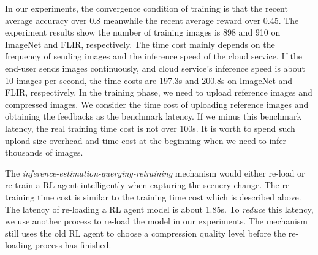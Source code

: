 \textcolor{revise}{In our experiments, the convergence condition of training is that the recent average accuracy over 0.8 meanwhile the recent average reward over 0.45. The experiment results show the number of training images is 898 and 910 on ImageNet and FLIR, respectively. The time cost mainly depends on the frequency of sending images and the inference speed of the cloud service. If the end-user sends images continuously, and cloud service's inference speed is about 10 images per second, the time costs are 197.3s and 200.8s on ImageNet and FLIR, respectively. In the training phase, we need to upload reference images and compressed images. We consider the time cost of uploading reference images and obtaining the feedbacks as the benchmark latency. If we minus this benchmark latency, the real training time cost is not over 100s. It is worth to spend such upload size overhead and time cost at the beginning when we need to infer thousands of images.}


\textcolor{revise}{The \emph{inference-estimation-querying-retraining} mechanism would either re-load or re-train a RL agent intelligently when capturing the scenery change. The re-training time cost is similar to the training time cost which is described above. The latency of re-loading a RL agent model is about 1.85s. To \emph{reduce} this latency, we use another process to re-load the model in our experiments. The mechanism still uses the old RL agent to choose a compression quality level before the re-loading process has finished.}
